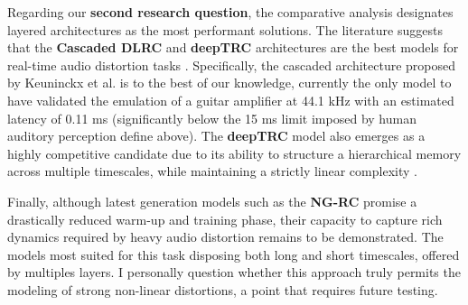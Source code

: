 \vspace{0.5cm}

Regarding our \textbf{second research question}, the comparative analysis designates layered architectures as the most performant solutions. The literature suggests that the \textbf{Cascaded DLRC} and \textbf{deepTRC} architectures are the best models for real-time audio distortion tasks \cite{Keuninckx2017RealTime, goldmann2020deep}. Specifically, the cascaded architecture proposed by Keuninckx et al. is to the best of our knowledge, currently the only model to have validated the emulation of a guitar amplifier at 44.1 kHz with an estimated latency of 0.11 ms (significantly below the 15 ms limit imposed by human auditory perception define above). The \textbf{deepTRC} model also emerges as a highly competitive candidate due to its ability to structure a hierarchical memory across multiple timescales, while maintaining a strictly linear complexity \cite{goldmann2020deep}.

\vspace{0.5cm}

Finally, although latest generation models such as the \textbf{NG-RC} promise a drastically reduced warm-up and training phase, their capacity to capture rich dynamics required by heavy audio distortion remains to be demonstrated. The models most suited for this task disposing both long and short timescales, offered by multiples layers. I personally question whether this approach truly permits the modeling of strong non-linear distortions, a point that requires future testing.


